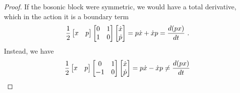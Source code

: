     \begin{proof}
        If the bosonic block were symmetric, we would have a total derivative, which in the action it is a boundary term
        \begin{equation*}
            \frac{1}{2} \begin{bmatrix} x & p \end{bmatrix} \begin{bmatrix}
                0 & 1 \\ 1 & 0
            \end{bmatrix} \begin{bmatrix} \dot x \\ \dot p \end{bmatrix} = p \dot x + \dot x p = \frac{d(px)}{dt} ~.
        \end{equation*}
        Instead, we have
        \begin{equation*}
            \frac{1}{2} \begin{bmatrix} x & p \end{bmatrix} \begin{bmatrix}
                0 & 1 \\ -1 & 0
            \end{bmatrix} \begin{bmatrix} \dot x \\ \dot p \end{bmatrix} = p \dot x - \dot x p \neq \frac{d(px)}{dt}
        \end{equation*}


\end{proof}
